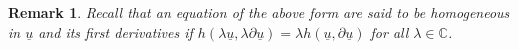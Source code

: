 \documentclass[10pt,a4paper]{article}
\theoremstyle{plain}
\newtheorem{remark}{Remark}
\begin{document}
\begin{remark}
\emph{ Recall that an equation of the
above form are said to be \textit{homogeneous in} $\underline{u}$
\textit{and its first derivatives} if
$h (\lambda\underline{u},\lambda\partial\underline{u})=\lambda
h(\underline{u}, \partial\underline{u})$ for all
$\lambda\in\mathbb{C}$. }
\end{remark}





\end{document}
